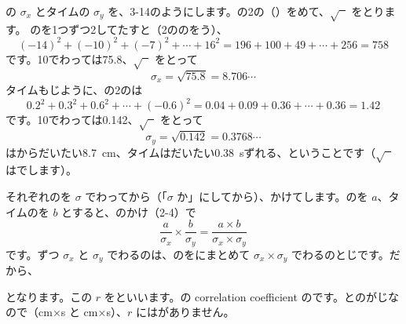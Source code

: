 の $\sigma_x$ とタイムの $\sigma_y$ を、3-14のようにします。の2の（）をめて、$\sqrt{\phantom{x}}$ をとります。
のを1つずつ2してたすと（2ののをう）、
\[ (-14)^2+(-10)^2+(-7)^2+\cdots+16^2=196+100+49+\cdots+256=758 \]
です。10でわっては75.8、$\sqrt{\phantom{x}}$ をとって
\[ \sigma_x=\sqrt{75.8}=8.706\cdots \]
タイムもじように、の2のは
\[ 0.2^2+0.3^2+0.6^2+\cdots+(-0.6)^2=0.04+0.09+0.36+\cdots+0.36=1.42 \]
です。10でわっては0.142、$\sqrt{\phantom{x}}$ をとって
\[ \sigma_y=\sqrt{0.142}=0.3768\cdots \]
はからだいたい\qty{8.7}{cm}、タイムはだいたい\qty{0.38}{s}ずれる、ということです（$\sqrt{\phantom{x}}$ はでします）。

それぞれのを $\sigma$ でわってから（「$\sigma$ か」にしてから）、かけてします。のを $a$、タイムのを $b$ とすると、のかけ（2-4）で
\[ \frac{a}{\sigma_x}\times\frac{b}{\sigma_y}=\frac{a\times b}{\sigma_x\times\sigma_y} \]
です。ずつ $\sigma_x$ と $\sigma_y$ でわるのは、のをにまとめて $\sigma_x\times\sigma_y$ でわるのとじです。だから、
\noindent\begin{minipage}[t]{0.46\linewidth}\vspace{0pt}
となります。この $r$ を\textbf{}といいます。の correlation coefficient のです。とのがじなので（cm×s と cm×s）、$r$ にはがありません。
\end{minipage}\hfill
\begin{minipage}[t]{67mm}\vspace{0pt}\end{minipage}\par\vspace{4pt}

